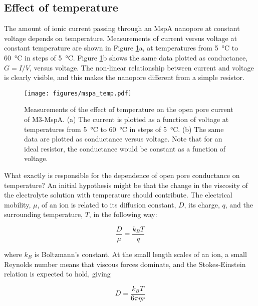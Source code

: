 \subsection{Effect of temperature}

The amount of ionic current passing through an MspA nanopore at constant voltage depends on temperature.  Measurements of current versus voltage at constant temperature are shown in Figure \ref{fig:mspa_current_temp}a, at temperatures from \SI{5}{\degreeCelsius} to \SI{60}{\degreeCelsius} in steps of \SI{5}{\degreeCelsius}.  Figure \ref{fig:mspa_current_temp}b shows the same data plotted as conductance, $G=I/V$, versus voltage.  The non-linear relationship between current and voltage is clearly visible, and this makes the nanopore different from a simple resistor.

\begin{figure}[h]
\begin{centering}
\texttt{[image: figures/mspa\_temp.pdf]}
\caption[MspA current versus temperature]{Measurements of the effect of temperature on the open pore current of M3-MspA.  (a) The current is plotted as a function of voltage at temperatures from \SI{5}{\degreeCelsius} to \SI{60}{\degreeCelsius} in steps of \SI{5}{\degreeCelsius}.  (b) The same data are plotted as conductance versus voltage.  Note that for an ideal resistor, the conductance would be constant as a function of voltage.}
\label{fig:mspa_current_temp}
\end{centering}
\end{figure}

What exactly is responsible for the dependence of open pore conductance on temperature?  An initial hypothesis might be that the change in the viscosity of the electrolyte solution with temperature should contribute.  The electrical mobility, $\mu$, of an ion is related to its diffusion constant, $D$, its charge, $q$, and the surrounding temperature, $T$, in the following way:

\begin{equation}
\frac{D}{\mu} = \frac{k_B T}{q}
\label{eqn:einstein_mobility}
\end{equation}

\noindent
where $k_B$ is Boltzmann's constant.  At the small length scales of an ion, a small Reynolds number means that viscous forces dominate, and the Stokes-Einstein relation is expected to hold, giving

\begin{equation}
D = \frac{k_B T}{6\pi\eta r}
\label{eqn:stokes_einstein}
\end{equation}

